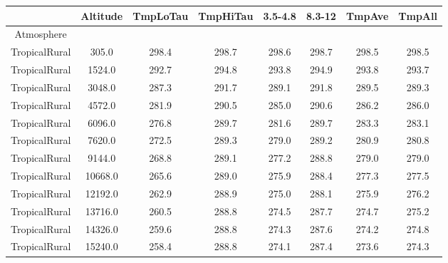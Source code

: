 \documentclass{workpackage}
\begin{document}
\begin{center}

\begin{normalsize}

\begin{tabular}{|c|c|c|c|c|c|c|c|}
\hline
&Altitude&TmpLoTau&TmpHiTau&3.5-4.8&8.3-12&TmpAve&TmpAll\\\hline
Atmosphere&&&&&&&\\\hline
TropicalRural&305.0&298.4&298.7&298.6&298.7&298.5&298.5\\\hline
TropicalRural&1524.0&292.7&294.8&293.8&294.9&293.8&293.7\\\hline
TropicalRural&3048.0&287.3&291.7&289.1&291.8&289.5&289.3\\\hline
TropicalRural&4572.0&281.9&290.5&285.0&290.6&286.2&286.0\\\hline
TropicalRural&6096.0&276.8&289.7&281.6&289.7&283.3&283.1\\\hline
TropicalRural&7620.0&272.5&289.3&279.0&289.2&280.9&280.8\\\hline
TropicalRural&9144.0&268.8&289.1&277.2&288.8&279.0&279.0\\\hline
TropicalRural&10668.0&265.6&289.0&275.9&288.4&277.3&277.5\\\hline
TropicalRural&12192.0&262.9&288.9&275.0&288.1&275.9&276.2\\\hline
TropicalRural&13716.0&260.5&288.8&274.5&287.7&274.7&275.2\\\hline
TropicalRural&14326.0&259.6&288.8&274.3&287.6&274.2&274.8\\\hline
TropicalRural&15240.0&258.4&288.8&274.1&287.4&273.6&274.3\\\hline

\end{tabular}
\end{normalsize}
\end{center}
\end{document}
